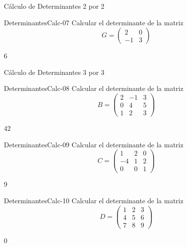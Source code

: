 \documentclass[a4,11pt]{aleph-notas}
\begin{document}
\begin{quiz}{Cálculo de Determinantes 2 por 2}
\begin{numerical}[tolerance=0]%
    {DeterminantesCalc-07}
    Calcular el determinante de la matriz 
    \[
        G = \begin{pmatrix}
            2 & 0\\
            -1 & 3 
        \end{pmatrix}
    \]
    \item 6
\end{numerical}

\end{quiz}

\begin{quiz}{Cálculo de Determinantes 3 por 3}

\begin{numerical}[tolerance=0]%
    {DeterminantesCalc-08}
    Calcular el determinante de la matriz
    \[
        B = \begin{pmatrix}
            2 & -1 & 3\\
            0 & 4 & 5\\
            1 & 2 & 3
        \end{pmatrix}
    \]
    \item 42
\end{numerical}

\begin{numerical}[tolerance=0]%
    {DeterminantesCalc-09}
    Calcular el determinante de la matriz
    \[
        C = \begin{pmatrix}
            1 & 2 & 0\\
            -4 & 1 & 2\\
            0 & 0 & 1
        \end{pmatrix}
    \]
    \item 9
\end{numerical}

\begin{numerical}[tolerance=0]%
    {DeterminantesCalc-10}
    Calcular el determinante de la matriz
    \[
        D = \begin{pmatrix}
            1 & 2 & 3\\
            4 & 5 & 6\\
            7 & 8 & 9
        \end{pmatrix}
    \]
    \item 0
\end{numerical}


\end{quiz}
\end{document}

